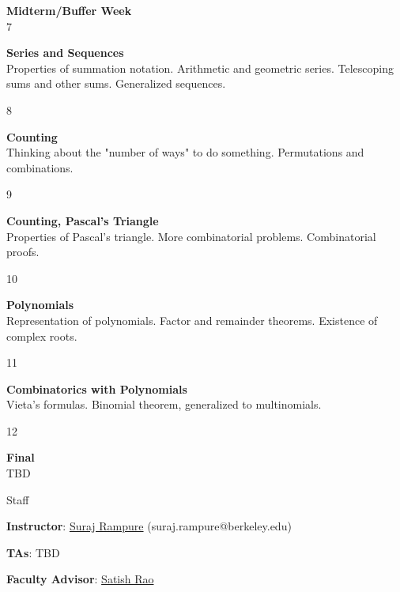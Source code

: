 \documentclass[]{article}
\begin{document}
\textbf{Midterm/Buffer Week}\\

7

\textbf{Series and Sequences}\\
Properties of summation notation. Arithmetic and geometric series.
Telescoping sums and other sums. Generalized sequences.

8

\textbf{Counting}\\
Thinking about the "number of ways" to do something. Permutations and
combinations.

9

\textbf{Counting, Pascal's Triangle}\\
Properties of Pascal's triangle. More combinatorial problems.
Combinatorial proofs.

10

\textbf{Polynomials}\\
Representation of polynomials. Factor and remainder theorems. Existence
of complex roots.

11

\textbf{Combinatorics with Polynomials}\\
Vieta's formulas. Binomial theorem, generalized to multinomials.

12

\textbf{Final}\\
TBD

Staff

\textbf{Instructor}: \href{http://surajrampure.com}{Suraj Rampure}
(suraj.rampure@berkeley.edu)

\textbf{TAs}: TBD

\textbf{Faculty Advisor}:
\href{https://www2.eecs.berkeley.edu/Faculty/Homepages/rao.html}{Satish
Rao}
\end{document}
